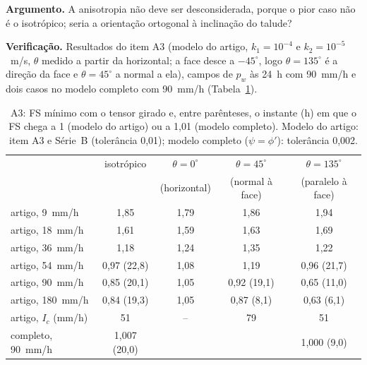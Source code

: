 \textbf{Argumento.} A anisotropia n\~ao deve ser desconsiderada, porque o pior caso n\~ao \'e o isotr\'opico; seria a
orienta\c{c}\~ao ortogonal \`a inclina\c{c}\~ao do talude?

\textbf{Verifica\c{c}\~ao.} Resultados do item A3 (modelo do artigo, $k_1=10^{-4}$ e $k_2=10^{-5}$~m/s, $\theta$
medido a partir da horizontal; a face desce a $-45^\circ$, logo $\theta=135^\circ$ \'e a dire\c{c}\~ao da face e
$\theta=45^\circ$ a normal a ela), campos de $p_w$ \`as 24~h com 90~mm/h e dois casos no modelo completo com 90~mm/h
(Tabela~\ref{tab:disc_A3}).

\begin{table}[h!]
\centering\small
\caption{A3: FS m\'inimo com o tensor girado e, entre par\^enteses, o instante (h) em que o FS chega a 1 (modelo do
artigo) ou a 1,01 (modelo completo). Modelo do artigo: item A3 e S\'erie~B (toler\^ancia 0,01); modelo completo
($\psi=\phi'$): toler\^ancia 0,002.}\label{tab:disc_A3}
\begin{tabular}{lcccc}
\toprule
& isotr\'opico & $\theta=0^\circ$ & $\theta=45^\circ$ & $\theta=135^\circ$\\
& & (horizontal) & (normal \`a face) & (paralelo \`a face)\\
\midrule
artigo, 9~mm/h & 1,85 & 1,79 & 1,86 & 1,94\\
artigo, 18~mm/h & 1,61 & 1,59 & 1,63 & 1,69\\
artigo, 36~mm/h & 1,18 & 1,24 & 1,35 & 1,22\\
artigo, 54~mm/h & 0,97 (22,8) & 1,08 & 1,19 & 0,96 (21,7)\\
artigo, 90~mm/h & 0,85 (20,1) & 1,05 & 0,92 (19,1) & 0,65 (11,0)\\
artigo, 180~mm/h & 0,84 (19,3) & 1,05 & 0,87 (8,1) & 0,63 (6,1)\\
artigo, $I_c$ (mm/h) & 51 & -- & 79 & 51\\
completo, 90~mm/h & 1,007 (20,0) & & & 1,000 (9,0)\\
\bottomrule
\end{tabular}
\end{table}

